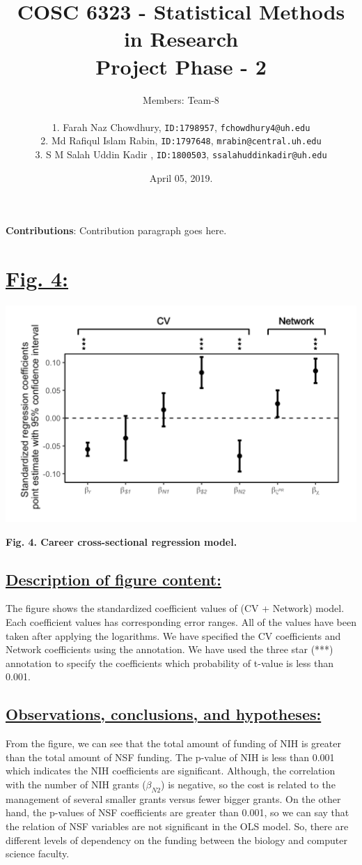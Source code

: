 \documentclass{article}\usepackage[]{graphicx}\usepackage[]{color}
\title{COSC 6323 - Statistical Methods in Research\\Project Phase - 2\\}
\author{%
    Members: Team-8 \\\\
    1. Farah Naz Chowdhury,    \texttt{ID:1798957}, \texttt{fchowdhury4@uh.edu}      \vspace{2pt} \\
    2. Md Rafiqul Islam Rabin, \texttt{ID:1797648}, \texttt{mrabin@central.uh.edu}   \vspace{2pt} \\
    3. S M Salah Uddin Kadir , \texttt{ID:1800503}, \texttt{ssalahuddinkadir@uh.edu} \vspace{2pt} \\
}
\date{April 05, 2019.}
\begin{document}
\maketitle
\par{\textbf{Contributions}: Contribution paragraph goes here.}

\newpage
\section*{\underline{Fig. 4:}}
\begin{center}
\includegraphics[scale=.75]{4.png}
\newline
\par{\textbf{Fig. 4. Career cross-sectional regression model.}}
\end{center}
\subsection*{\underline{Description of figure content:}}
\par{
The figure shows the standardized coefficient values of (CV + Network) model. Each coefficient values has corresponding error ranges. All of the values have been taken after applying the logarithms. We have specified the CV coefficients and Network coefficients using the annotation. We have used the three star (***) annotation to specify the coefficients which probability of t-value is less than 0.001.   
}
\subsection*{\underline{Observations, conclusions, and hypotheses:}}
\par{
From the figure, we can see that the total amount of funding of NIH is greater than the total amount of NSF funding. The p-value of NIH is less than 0.001 which indicates the NIH coefficients are significant. Although, the correlation with the number of NIH grants ($\beta_{N2}$) is negative, so the cost is related to the management of several smaller grants versus fewer bigger grants. On the other hand, the p-values of NSF coefficients are greater than 0.001, so we can say that the relation of NSF variables are not significant in the OLS model. So, there are different levels of dependency on the funding between the biology and computer science faculty.  
}
\end{document}
